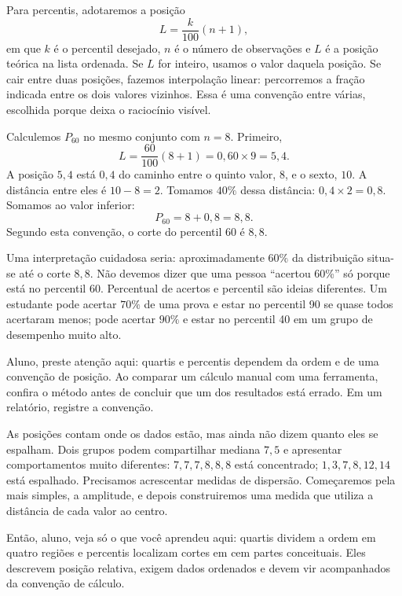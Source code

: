 Para percentis, adotaremos a posição
\[
L=\frac{k}{100}(n+1),
\]
em que $k$ é o percentil desejado, $n$ é o número de observações e $L$ é a posição teórica na lista ordenada. Se $L$ for inteiro, usamos o valor daquela posição. Se cair entre duas posições, fazemos interpolação linear: percorremos a fração indicada entre os dois valores vizinhos. Essa é uma convenção entre várias, escolhida porque deixa o raciocínio visível.

Calculemos $P_{60}$ no mesmo conjunto com $n=8$. Primeiro,
\[
L=\frac{60}{100}(8+1)=0{,}60\times9=5{,}4.
\]
A posição $5{,}4$ está $0{,}4$ do caminho entre o quinto valor, $8$, e o sexto, $10$. A distância entre eles é $10-8=2$. Tomamos $40\%$ dessa distância: $0{,}4\times2=0{,}8$. Somamos ao valor inferior:
\[
P_{60}=8+0{,}8=8{,}8.
\]
Segundo esta convenção, o corte do percentil 60 é $8{,}8$.

Uma interpretação cuidadosa seria: aproximadamente $60\%$ da distribuição situa-se até o corte $8{,}8$. Não devemos dizer que uma pessoa ``acertou 60\%'' só porque está no percentil 60. Percentual de acertos e percentil são ideias diferentes. Um estudante pode acertar $70\%$ de uma prova e estar no percentil 90 se quase todos acertaram menos; pode acertar $90\%$ e estar no percentil 40 em um grupo de desempenho muito alto.

\begin{GuidedBox}
Aluno, preste atenção aqui: quartis e percentis dependem da ordem e de uma convenção de posição. Ao comparar um cálculo manual com uma ferramenta, confira o método antes de concluir que um dos resultados está errado. Em um relatório, registre a convenção.
\end{GuidedBox}

As posições contam onde os dados estão, mas ainda não dizem quanto eles se espalham. Dois grupos podem compartilhar mediana $7{,}5$ e apresentar comportamentos muito diferentes: ${7,7,7,8,8,8}$ está concentrado; ${1,3,7,8,12,14}$ está espalhado. Precisamos acrescentar medidas de dispersão. Começaremos pela mais simples, a amplitude, e depois construiremos uma medida que utiliza a distância de cada valor ao centro.

\begin{SummaryBox}
Então, aluno, veja só o que você aprendeu aqui: quartis dividem a ordem em quatro regiões e percentis localizam cortes em cem partes conceituais. Eles descrevem posição relativa, exigem dados ordenados e devem vir acompanhados da convenção de cálculo.
\end{SummaryBox}

